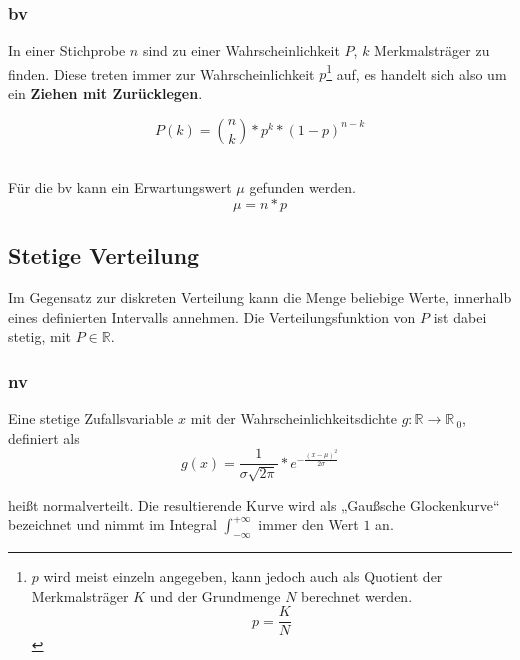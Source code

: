 \documentclass{school}
\begin{document}
\newpage
\subsubsection{\gls{bv}}
In einer Stichprobe $n$ sind zu einer Wahrscheinlichkeit $P$, $k$ Merkmalsträger zu finden. Diese treten immer zur Wahrscheinlichkeit $p$\footnote{$p$ wird meist einzeln angegeben, kann jedoch auch als Quotient der Merkmalsträger $K$ und der Grundmenge $N$ berechnet werden. $$p = \frac{K}{N}$$} auf, es handelt sich also um ein \textbf{Ziehen mit Zurücklegen}.

$$P(k) = \binom{n}{k} * p^k * (1 - p)^{n-k}$$
\begin{vardefs}
\end{vardefs}~\\
Für die \gls{bv} kann ein Erwartungswert $\mu$ gefunden werden.
$$\mu = n * p$$

\subsection{Stetige Verteilung}
Im Gegensatz zur diskreten Verteilung kann die Menge beliebige Werte, innerhalb eines definierten Intervalls annehmen. Die Verteilungsfunktion von $P$ ist dabei stetig, mit $P \in \mathbb{R}$.

\subsubsection{\gls{nv}}
Eine stetige Zufallsvariable $x$ mit der Wahrscheinlichkeitsdichte $g : \mathbb{R} \to \mathbb{R}_{\>0}$, definiert als
$$g(x) = \frac{1}{\sigma\sqrt{2\pi}} * e^{-\frac{(x-\mu)^2}{2\sigma}}$$
\begin{vardefs}
\end{vardefs}
heißt normalverteilt. Die resultierende Kurve wird als „Gaußsche Glockenkurve“ bezeichnet und nimmt im Integral $\int_{-\infty}^{+\infty}$ immer den Wert $1$ an.

\newpage
\end{document}
